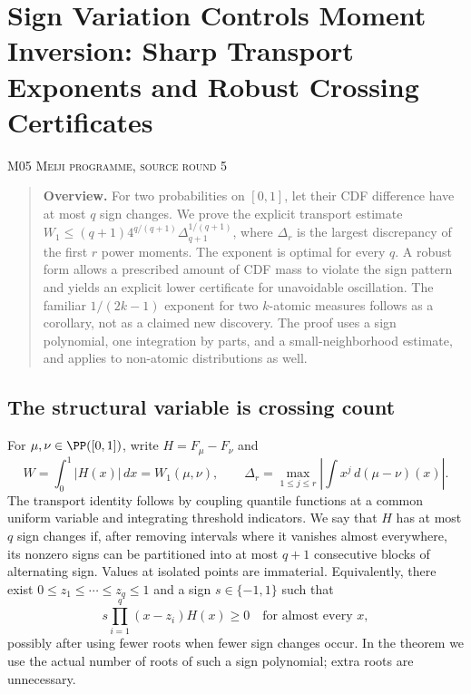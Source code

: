 \documentclass[11pt,a4paper]{article}
\theoremstyle{definition}\newtheorem{definition}[theorem]{Definition}
\theoremstyle{remark}\newtheorem{remark}[theorem]{Remark}
\numberwithin{equation}{section}
\begin{document}
\clearpage
\section[M05 --- Sign Variation Controls Moment Inversion: Sharp Transport Exponents and Robust Crossing Certificates]{Sign Variation Controls Moment Inversion: Sharp Transport Exponents and Robust Crossing Certificates}\label{contrib-M05}
\noindent\textsc{M05 \quad Meiji programme, source round 5}\par\medskip


\begin{quote}\small\textbf{Overview.} For two probabilities on $[0,1]$, let their CDF difference have at most $q$ sign changes. We prove the explicit transport estimate $W_1\le(q+1)4^{q/(q+1)}\Delta_{q+1}^{1/(q+1)}$, where $\Delta_r$ is the largest discrepancy of the first $r$ power moments. The exponent is optimal for every $q$. A robust form allows a prescribed amount of CDF mass to violate the sign pattern and yields an explicit lower certificate for unavoidable oscillation. The familiar $1/(2k-1)$ exponent for two $k$-atomic measures follows as a corollary, not as a claimed new discovery. The proof uses a sign polynomial, one integration by parts, and a small-neighborhood estimate, and applies to non-atomic distributions as well.\end{quote}

\subsection{The structural variable is crossing count}\label{M05-sec-1}
For $\mu,\nu\in\PP([0,1])$, write $H=F_\mu-F_\nu$ and
\[
 W=\int_0^1|H(x)|\,dx=W_1(\mu,\nu),\qquad
 \Delta_r=\max_{1\le j\le r}\left|\int x^j\,d(\mu-\nu)(x)\right|.
\]
The transport identity follows by coupling quantile functions at a common uniform variable and integrating threshold indicators. We say that $H$ has at most $q$ sign changes if, after removing intervals where it vanishes almost everywhere, its nonzero signs can be partitioned into at most $q+1$ consecutive blocks of alternating sign. Values at isolated points are immaterial. Equivalently, there exist $0\le z_1\le\cdots\le z_q\le1$ and a sign $s\in\{-1,1\}$ such that
\[
 s\prod_{i=1}^q(x-z_i)H(x)\ge0\quad\text{for almost every }x,
\]
possibly after using fewer roots when fewer sign changes occur. In the theorem we use the actual number of roots of such a sign polynomial; extra roots are unnecessary.
\end{document}
